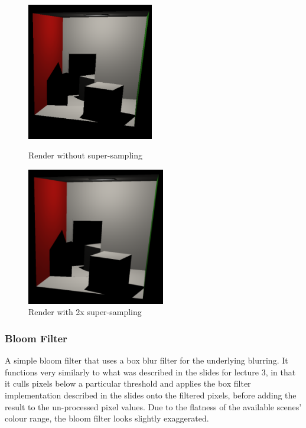 \documentclass{article}
\begin{document}
    \begin{figure}[!htb]
          \includegraphics[width=\linewidth , height=6cm]{images/supersampling_non_supersampled.png}
          \caption*{Render without super-sampling}
        \endminipage\hfill
          \includegraphics[width=\linewidth , height=6cm]{images/supersampling_supersampled.png}
          \caption*{Render with 2x super-sampling}
        \endminipage
    \end{figure}

    \subsubsection{Bloom Filter}
    A simple bloom filter that uses a box blur filter for the underlying blurring.
    It functions very similarly to what was described in the slides for lecture 3,
    in that it culls pixels below a particular threshold and applies the box filter implementation described in the slides onto the filtered pixels,
    before adding the result to the un-processed pixel values.
    Due to the flatness of the available scenes' colour range,
    the bloom filter looks slightly exaggerated.

    \newpage
\end{document}
